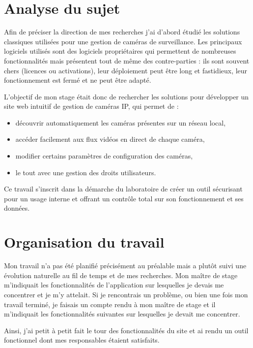 \section{Analyse du sujet}

Afin de préciser la direction de mes recherches j'ai d'abord étudié les solutions classiques utilisées pour une gestion de caméras de surveillance. Les principaux logiciels utilisés sont des logiciels propriétaires qui permettent de nombreuses fonctionnalités mais présentent tout de même des contre-parties : ils sont souvent chers (licences ou activations), leur déploiement peut être long et fastidieux, leur fonctionnement est fermé et ne peut être adapté.

L’objectif de mon stage était donc de rechercher les solutions pour développer un site web intuitif de gestion de caméras IP, qui permet de :

\begin{itemize}
	\item découvrir automatiquement les caméras présentes sur un réseau local,
	\item accéder facilement aux flux vidéos en direct de chaque caméra,
	\item modifier certains paramètres de configuration des caméras,
        \item le tout avec une gestion des droits utilisateurs.
\end{itemize}
\vspace{10px}

Ce travail s'inscrit dans la démarche du laboratoire de créer un outil sécurisant pour un usage interne et offrant un contrôle total sur son fonctionnement et ses données.

\section{Organisation du travail}

Mon travail n'a pas été planifié précisément au préalable mais a plutôt suivi une évolution naturelle au fil de temps et de mes recherches. Mon maître de stage m'indiquait les fonctionnalités de l'application sur lesquelles je devais me concentrer et je m'y attelait. Si je rencontrais un problème, ou bien une fois mon travail terminé, je faisais un compte rendu à mon maître de stage et il m'indiquait les fonctionnalités suivantes sur lesquelles je devait me concentrer. 

Ainsi, j'ai petit à petit fait le tour des fonctionnalités du site et ai rendu un outil fonctionnel dont mes responsables étaient satisfaits. 


